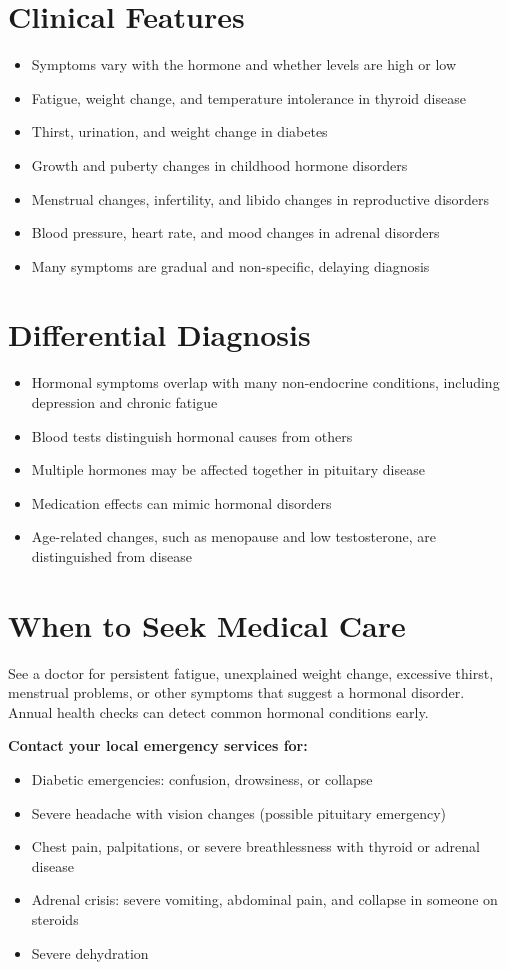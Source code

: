 \section*{Clinical Features}
\begin{itemize}
    \item Symptoms vary with the hormone and whether levels are high or low
    \item Fatigue, weight change, and temperature intolerance in thyroid disease
    \item Thirst, urination, and weight change in diabetes
    \item Growth and puberty changes in childhood hormone disorders
    \item Menstrual changes, infertility, and libido changes in reproductive disorders
    \item Blood pressure, heart rate, and mood changes in adrenal disorders
    \item Many symptoms are gradual and non-specific, delaying diagnosis
\end{itemize}

\section*{Differential Diagnosis}
\begin{itemize}
    \item Hormonal symptoms overlap with many non-endocrine conditions, including depression and chronic fatigue
    \item Blood tests distinguish hormonal causes from others
    \item Multiple hormones may be affected together in pituitary disease
    \item Medication effects can mimic hormonal disorders
    \item Age-related changes, such as menopause and low testosterone, are distinguished from disease
\end{itemize}

\section*{When to Seek Medical Care}
See a doctor for persistent fatigue, unexplained weight change, excessive thirst, menstrual problems, or other symptoms that suggest a hormonal disorder. Annual health checks can detect common hormonal conditions early.

\textbf{Contact your local emergency services for:}
\begin{itemize}
    \item Diabetic emergencies: confusion, drowsiness, or collapse
    \item Severe headache with vision changes (possible pituitary emergency)
    \item Chest pain, palpitations, or severe breathlessness with thyroid or adrenal disease
    \item Adrenal crisis: severe vomiting, abdominal pain, and collapse in someone on steroids
    \item Severe dehydration
\end{itemize}

